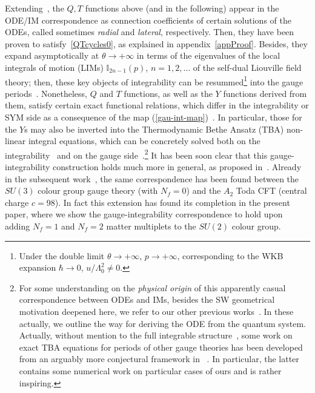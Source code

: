 \documentclass[11pt,a4paper]{elsarticle}
\def \th {\theta}
\def\th{\theta}
\numberwithin{figure}{section}
\numberwithin{table}{section}
\begin{document}
Extending~\cite{DoreyTateo1999}, the $Q,T$ functions above (and in the following) appear in the ODE/IM correspondence as connection coefficients of certain solutions of the ODEs, called sometimes {\it radial} and  {\it lateral}, respectively. Then, they have been proven to satisfy~\eqref{QTcycles0}, as explained in appendix~\ref{appProof}. Besides, they expand asymptotically at $\th \to +\infty$ in terms of the eigenvalues of the local integrals of motion (LIMs) $\mathbb{I}_{2n-1}(p)$, $n=1,2,\dots$ of the self-dual Liouville field theory; then, these key objects of integrability can be resummed\footnote{Under the double limit $\th \to +\infty$, $p \to + \infty$, corresponding to the WKB expansion $\hbar \to 0$, $u/\Lambda_0^2 \neq 0 $.} into the gauge periods~\cite{FioravantiGregori:2019}. Nonetheless, $Q$ and $T$ functions, as well as the $Y$ functions derived from them, satisfy certain exact functional relations, which differ in the integrability or SYM side as a consequence of the map (\ref{gau-int-map})~\cite{FioravantiGregori:2019}. In particular, those for the $Y$s may also be inverted into the Thermodynamic Bethe Ansatz (TBA) non-linear integral equations, which can be concretely solved both on the integrability~\cite{Zamolodchikov:2000,ZamolodchikovMemorial} and on the gauge side~\cite{FioravantiGregori:2019}.\footnote{For some understanding on the \textit{physical origin} of this apparently casual correspondence between ODEs and IMs, besides the SW geometrical motivation deepened here, we refer to our other previous works~\cite{FioravantiRossiShu:2020,FioravantiRossi:2021}. In these actually, we outline the way for deriving the ODE from the quantum system. Actually, without mention to the full integrable structure~\cite{FioravantiRossiShu:2020}, some work on exact TBA equations for periods of other gauge theories has been developed from an arguably more conjectural framework in ~\cite{GaiottoMooreNeitzke:2008,GaiottoMooreNeitzke:2009,GaiottoOpers}. In particular, the latter contains some numerical work on particular cases of ours and is rather inspiring.} It has been soon clear that this gauge-integrability construction holds much more in general, as proposed in~\cite{FioravantiGregori:2019}. Already in the subsequent work~\cite{FioravantiPoghossian:2019}, the same correspondence has been found between the $SU(3)$ colour group gauge theory (with $N_f=0$) and the $A_2$ Toda CFT (central charge $c=98$). In fact this extension has found its completion in the present paper, where we show the gauge-integrability correspondence to hold upon adding $N_f=1$ and $N_f=2$ matter multiplets to the $SU(2)$ colour group.
\end{document}
